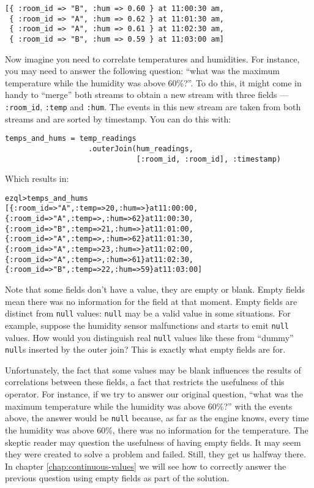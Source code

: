 \documentclass{report}
\newenvironment{evaluation}
{
  \framed
  \begin{alltt}
}
{
  \end{alltt}
  \endframed
}
\begin{document}
\begin{verbatim}
[{ :room_id => "B", :hum => 0.60 } at 11:00:30 am,
 { :room_id => "A", :hum => 0.62 } at 11:01:30 am,
 { :room_id => "A", :hum => 0.61 } at 11:02:30 am,
 { :room_id => "B", :hum => 0.59 } at 11:03:00 am]
\end{verbatim}

Now imagine you need to correlate temperatures and humidities. For
instance, you may need to answer the following question: ``what was
the maximum temperature while the humidity was above 60\%?''. To do
this, it might come in handy to ``merge'' both streams to obtain a new
stream with three fields --- \verb=:room_id=, \verb=:temp= and
\verb=:hum=. The events in this new stream are taken from both
streams and are sorted by timestamp. You can do this with:

\begin{verbatim}
temps_and_hums = temp_readings
                   .outerJoin(hum_readings,
                              [:room_id, :room_id], :timestamp)
\end{verbatim}

Which results in:
\pagebreak
\begin{evaluation}
ezql> temps_and_hums
[\{ :room_id => "A", :temp =>  20, :hum =>     \} at 11:00:00,
 \{ :room_id => "A", :temp =>    , :hum =>  62 \} at 11:00:30,
 \{ :room_id => "B", :temp =>  21, :hum =>     \} at 11:01:00,
 \{ :room_id => "A", :temp =>    , :hum =>  62 \} at 11:01:30,
 \{ :room_id => "A", :temp =>  23, :hum =>     \} at 11:02:00,
 \{ :room_id => "A", :temp =>    , :hum =>  61 \} at 11:02:30,
 \{ :room_id => "B", :temp =>  22, :hum =>  59 \} at 11:03:00]
\end{evaluation}

Note that some fields don't have a value, they are empty or
blank. Empty fields mean there was no information for the field at
that moment. Empty fields are distinct from \verb=null= values:
\verb=null= may be a valid value in some situations. For example,
suppose the humidity sensor malfunctions and starts to emit
\verb=null= values. How would you distinguish real \verb=null= values
like these from ``dummy'' \verb=null=s inserted by the outer join?
This is exactly what empty fields are for.

Unfortunately, the fact that some values may be blank influences the
results of correlations between these fields, a fact that restricts
the usefulness of this operator. For instance, if we try to answer our
original question, ``what was the maximum temperature while the
humidity was above 60\%?'' with the events above, the answer would be
\verb=null= because, as far as the engine knows, every time the
humidity was above 60\%, there was no information for the
temperature. The skeptic reader may question the usefulness of having
empty fields. It may seem they were created to solve a problem and
failed. Still, they get us halfway there. In chapter
\ref{chap:continuous-values} we will see how to correctly answer the
previous question using empty fields as part of the solution.
\end{document}

